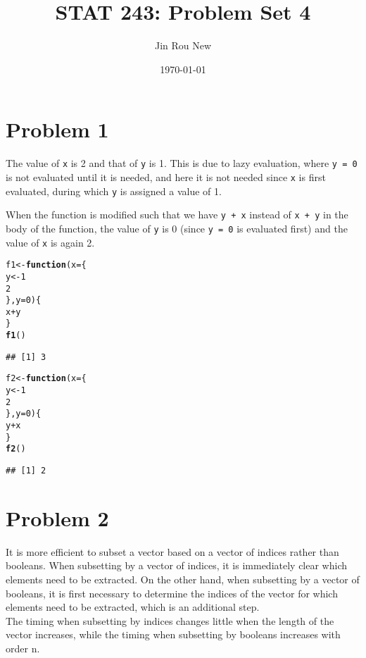 \documentclass{article}\usepackage[]{graphicx}\usepackage[]{color}
\title{STAT 243: Problem Set 4}
\author{Jin Rou New}
\date{\today}
\makeatletter
\newcommand{\hlnum}[1]{\textcolor[rgb]{0.686,0.059,0.569}{#1}}%
\newcommand{\hlopt}[1]{\textcolor[rgb]{0,0,0}{#1}}%
\newcommand{\hlstd}[1]{\textcolor[rgb]{0.345,0.345,0.345}{#1}}%
\newcommand{\hlkwa}[1]{\textcolor[rgb]{0.161,0.373,0.58}{\textbf{#1}}}%
\newcommand{\hlkwb}[1]{\textcolor[rgb]{0.69,0.353,0.396}{#1}}%
\newcommand{\hlkwc}[1]{\textcolor[rgb]{0.333,0.667,0.333}{#1}}%
\newcommand{\hlkwd}[1]{\textcolor[rgb]{0.737,0.353,0.396}{\textbf{#1}}}%
\newenvironment{kframe}{%
 \def\at@end@of@kframe{}%
 \ifinner\ifhmode%
  \def\at@end@of@kframe{\end{minipage}}%
  \begin{minipage}{\columnwidth}%
 \fi\fi%
 \def\FrameCommand##1{\hskip\@totalleftmargin \hskip-\fboxsep
 \colorbox{shadecolor}{##1}\hskip-\fboxsep
     \hskip-\linewidth \hskip-\@totalleftmargin \hskip\columnwidth}%
 \MakeFramed {\advance\hsize-\width
   \@totalleftmargin\z@ \linewidth\hsize
   \@setminipage}}%
 {\par\unskip\endMakeFramed%
 \at@end@of@kframe}
\newenvironment{knitrout}{}{} %
\makeatother
\begin{document}
\maketitle

\section{Problem 1}
The value of \texttt{x} is 2 and that of \texttt{y} is 1. This is due to lazy evaluation, where \texttt{y = 0} is not evaluated until it is needed, and here it is not needed since \texttt{x} is first evaluated, during which \texttt{y} is assigned a value of 1.

When the function is modified such that we have \texttt{y + x} instead of \texttt{x + y} in the body of the function, the value of \texttt{y} is 0 (since \texttt{y = 0} is evaluated first) and the value of \texttt{x} is again 2.

\begin{knitrout}
\color{fgcolor}\begin{kframe}
\begin{alltt}
 \hlstd{f1} \hlkwb{<-} \hlkwa{function}\hlstd{(}\hlkwc{x} \hlstd{= \{}
   \hlstd{y} \hlkwb{<-} \hlnum{1}
   \hlnum{2}
 \hlstd{\},} \hlkwc{y} \hlstd{=} \hlnum{0}\hlstd{) \{}
 \hlstd{x} \hlopt{+} \hlstd{y}
 \hlstd{\}}
 \hlkwd{f1}\hlstd{()}
\end{alltt}
\begin{verbatim}
## [1] 3
\end{verbatim}
\begin{alltt}
 \hlstd{f2} \hlkwb{<-} \hlkwa{function}\hlstd{(}\hlkwc{x} \hlstd{= \{}
   \hlstd{y} \hlkwb{<-} \hlnum{1}
   \hlnum{2}
 \hlstd{\},} \hlkwc{y} \hlstd{=} \hlnum{0}\hlstd{) \{}
   \hlstd{y} \hlopt{+} \hlstd{x}
 \hlstd{\}}
 \hlkwd{f2}\hlstd{()}
\end{alltt}
\begin{verbatim}
## [1] 2
\end{verbatim}
\end{kframe}
\end{knitrout}
\section{Problem 2}
It is more efficient to subset a vector based on a vector of indices rather than booleans. When subsetting by a vector of indices, it is immediately clear which elements need to be extracted. On the other hand, when subsetting by a vector of booleans, it is first necessary to determine the indices of the vector for which elements need to be extracted, which is an additional step. \\
The timing when subsetting by indices changes little when the length of the vector increases, while the timing when subsetting by booleans increases with order n.
\end{document}
